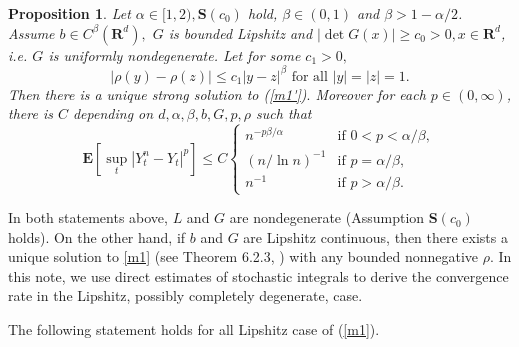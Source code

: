 \documentclass[11pt]{amsart}
\theoremstyle{plain}
\newtheorem{proposition}{Proposition}
\numberwithin{equation}{section}
\begin{document}
\begin{proposition}
\label{t1}Let $\alpha \in \lbrack 1,2),\mathbf{S}\left( c_{0}\right) $ hold, 
$\beta \in (0,1)$ and $\beta >1-\alpha /2$. Assume $b\in C^{\beta }\left( 
\mathbf{R}^{d}\right) ,$ $G$ is bounded Lipshitz and $\left\vert \det
G\left( x\right) \right\vert \geq c_{0}>0,x\in \mathbf{R}^{d}$, i.e. $G$ is
uniformly nondegenerate. Let for some $c_{1}>0,$ 
\begin{equation*}
\left\vert \rho \left( y\right) -\rho \left( z\right) \right\vert \leq
c_{1}\left\vert y-z\right\vert ^{\beta }\text{ for all }\left\vert
y\right\vert =\left\vert z\right\vert =1.
\end{equation*}
Then there is a unique strong solution to (\ref{m1'})$.$ Moreover for each $p\in \left( 0,\infty \right) $, there is $C$ depending on $d,\alpha ,\beta
,b,G,p,\rho $ such that\begin{equation*}
\mathbf{E}\left[ \sup_{t}\left\vert Y_{t}^{n}-Y_{t}\right\vert ^{p}\right]
\leq C\left\{ 
\begin{array}{ll}
n^{-p\beta /\alpha } & \text{if }0<p<\alpha /\beta , \\ 
\left( n/\ln n\right) ^{-1} & \text{if }p=\alpha /\beta , \\ 
n^{-1} & \text{if }p>\alpha /\beta .\end{array}\right.
\end{equation*}
\end{proposition}

In both statements above, $L$ and $G$ are nondegenerate (Assumption \textbf{S}$\left( c_{0}\right) $ holds). On the other hand, if $b$ and $G$ are
Lipshitz continuous, then there exists a unique solution to \eqref{m1} (see
Theorem 6.2.3, \cite{da}) with any bounded nonnegative $\rho $. In this
note, we use direct estimates of stochastic integrals to derive the
convergence rate in the Lipshitz, possibly completely degenerate, case.

The following statement holds for all Lipshitz case of (\ref{m1}).
\end{document}
